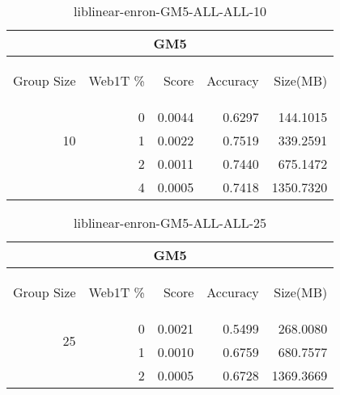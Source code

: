 \begin{center}
\begin{table}[htbp] 
 \begin{center}
\begin{tabular}{ | r | r | r | r | r |}
\hline
\multicolumn{5}{|c|}{GM5}\\
\hline
\begin{sideways}Group Size\end{sideways} & \begin{sideways}Web1T \%\end{sideways} & \begin{sideways}Score\end{sideways} & \begin{sideways}Accuracy\end{sideways} & \begin{sideways}Size(MB)\end{sideways}\\
\hline
\multirow{3}{*}{10}
 & 0 & 0.0044 & 0.6297 & 144.1015\\ \cline{2-5}
 & 1 & 0.0022 & 0.7519 & 339.2591\\ \cline{2-5}
 & 2 & 0.0011 & 0.7440 & 675.1472\\ \cline{2-5}
 & 4 & 0.0005 & 0.7418 & 1350.7320\\ \cline{2-5}
\hline
\end{tabular}
\caption{liblinear-enron-GM5-ALL-ALL-10}
\label{table:liblinear-enron-GM5-ALL-ALL-10}
\end{center}
 \end{table}
\end{center}

\begin{center}
\begin{table}[htbp] 
 \begin{center}
\begin{tabular}{ | r | r | r | r | r |}
\hline
\multicolumn{5}{|c|}{GM5}\\
\hline
\begin{sideways}Group Size\end{sideways} & \begin{sideways}Web1T \%\end{sideways} & \begin{sideways}Score\end{sideways} & \begin{sideways}Accuracy\end{sideways} & \begin{sideways}Size(MB)\end{sideways}\\
\hline
\multirow{2}{*}{25}
 & 0 & 0.0021 & 0.5499 & 268.0080\\ \cline{2-5}
 & 1 & 0.0010 & 0.6759 & 680.7577\\ \cline{2-5}
 & 2 & 0.0005 & 0.6728 & 1369.3669\\ \cline{2-5}
\hline
\end{tabular}
\caption{liblinear-enron-GM5-ALL-ALL-25}
\label{table:liblinear-enron-GM5-ALL-ALL-25}
\end{center}
 \end{table}
\end{center}

